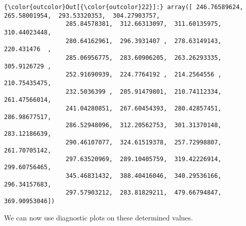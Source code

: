 \documentclass{article}
\begin{document}
            \begin{Verbatim}[commandchars=\\\{\}]
{\color{outcolor}Out[{\color{outcolor}22}]:} array([ 246.76589624,  265.58001954,  293.53320353,  304.27903757,
                 285.84578381,  312.66313097,  311.60135975,  310.44023448,
                 280.64162961,  296.3931407 ,  278.63149143,  220.431476  ,
                 285.06956775,  283.60906205,  263.26293335,  305.9126729 ,
                 252.91690939,  224.7764192 ,  214.2564556 ,  210.75435475,
                 232.5036399 ,  205.91479801,  210.74112334,  261.47566014,
                 241.04280851,  267.60454393,  280.42857451,  286.98677517,
                 286.52948096,  312.20562753,  301.31370148,  283.12186639,
                 290.46107077,  324.61519378,  257.72998807,  261.70705142,
                 297.63520969,  289.10405759,  319.42226914,  299.60756465,
                 345.46831432,  388.40416046,  340.29536166,  296.34157683,
                 297.57903212,  283.81829211,  479.66794847,  369.90953046])
\end{Verbatim}
        
    We can now use diagnostic plots on these determined values.
\end{document}
